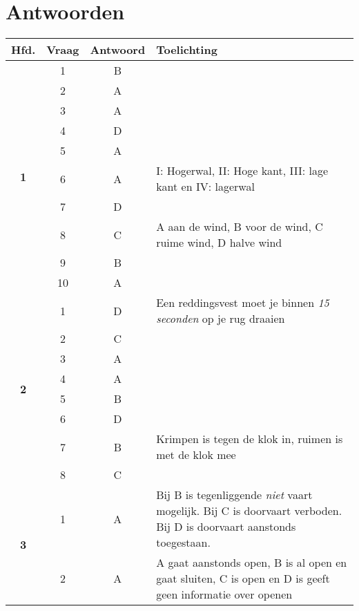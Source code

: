 \chapter{Antwoorden}
\vspace*{-120px}
\begin{table}[h!]
	\centering
	\begin{tabular}{c|c|c|m{9.5cm}}
		\textbf{Hfd.}       & \textbf{Vraag} & \textbf{Antwoord} & \textbf{Toelichting}                                             \\ \hline
		\multirow{10}{*}{\sffamily\bfseries{\textcolor{ocre}{\LARGE1}} } 
		& 1 & B & \\ \cline{2-4}          
		& 2 & A &  \\ \cline{2-4} 
		& 3 & A &  \\ \cline{2-4} 
		& 4 & D &  \\ \cline{2-4} 
		& 5 & A &  \\ \cline{2-4} 
		& 6 & A &  I: Hogerwal, II: Hoge kant, III: lage kant en IV: lagerwal \\ \cline{2-4} 
		& 7 & D &  \\ \cline{2-4} 
		& 8 & C &  A aan de wind,  B voor de wind,  C ruime wind, D halve wind\\ \cline{2-4} 
		& 9 & B & \\ \cline{2-4} 
		& 10 & A &  \\ \cline{2-4} \hline
		\multirow{8}{*}{\sffamily\bfseries{\textcolor{ocre}{\LARGE2}} } 
		& 1 & D & Een reddingsvest moet je binnen \textit{15 seconden} op je rug draaien \\ \cline{2-4} 
		& 2 & C &  \\ \cline{2-4} 
		& 3 & A &  \\ \cline{2-4} 
		& 4 & A & \\ \cline{2-4} 
		& 5 & B & \\ \cline{2-4} 
		& 6 & D & \\ \cline{2-4} 
		& 7 & B & Krimpen is tegen de klok in, ruimen is met de klok mee\\ \cline{2-4} 
		& 8 & C & \\ \cline{2-4}  \hline
		\multirow{5}{*}{\sffamily\bfseries{\textcolor{ocre}{\LARGE3}} } 
		& 1 & A &  Bij B is tegenliggende \textit{niet} vaart mogelijk. Bij C is doorvaart verboden. Bij D is doorvaart aanstonds toegestaan.\\ \cline{2-4} 
		& 2 & A &  A gaat aanstonds open, B is al open en gaat sluiten, C is open en D is geeft geen informatie over openen\\ \cline{2-4} 

\end{tabular}
\end{table}
